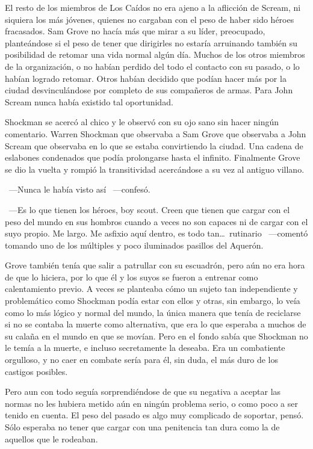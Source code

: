 El resto de los miembros de Los Caídos no era ajeno a la aflicción de Scream, ni siquiera los más jóvenes, quienes no cargaban con el peso de haber sido héroes fracasados. Sam Grove no hacía más que mirar a su líder, preocupado, planteándose si el peso de tener que dirigirles no estaría arruinando también su posibilidad de retomar una vida normal algún día. Muchos de los otros miembros de la organización, o no habían perdido del todo el contacto con su pasado, o lo habían logrado retomar. Otros habían decidido que podían hacer más por la ciudad desvinculándose por completo de sus compañeros de armas. Para John Scream nunca había existido tal oportunidad.

Shockman se acercó al chico y le observó con su ojo sano sin hacer ningún comentario. Warren Shockman que observaba a Sam Grove que observaba a John Scream que observaba en lo que se estaba convirtiendo la ciudad. Una cadena de eslabones condenados que podía prolongarse hasta el infinito. Finalmente Grove se dio la vuelta y rompió la transitividad acercándose a su vez al antiguo villano.

~---Nunca le había visto así ~---confesó.

~---Es lo que tienen los héroes, boy scout. Creen que tienen que cargar con el peso del mundo en sus hombros cuando a veces no son capaces ni de cargar con el suyo propio. Me largo. Me asfixio aquí dentro, es todo tan\dots\ rutinario ~---comentó tomando uno de los múltiples y poco iluminados pasillos del Aquerón.

Grove también tenía que salir a patrullar con su escuadrón, pero aún no era hora de que lo hiciera, por lo que él y los suyos se fueron a entrenar como calentamiento previo. A veces se planteaba cómo un sujeto tan independiente y problemático como Shockman podía estar con ellos y otras, sin embargo, lo veía como lo más lógico y normal del mundo, la única manera que tenía de reciclarse si no se contaba la muerte como alternativa, que era lo que esperaba a muchos de su calaña en el mundo en que se movían. Pero en el fondo sabía que Shockman no le temía a la muerte, e incluso secretamente la deseaba. Era un combatiente orgulloso, y no caer en combate sería para él, sin duda, el más duro de los castigos posibles.

Pero aun con todo seguía sorprendiéndose de que su negativa a aceptar las normas no les hubiera metido aún en ningún problema serio, o como poco a ser tenido en cuenta. El peso del pasado es algo muy complicado de soportar, pensó. Sólo esperaba no tener que cargar con una penitencia tan dura como la de aquellos que le rodeaban.


